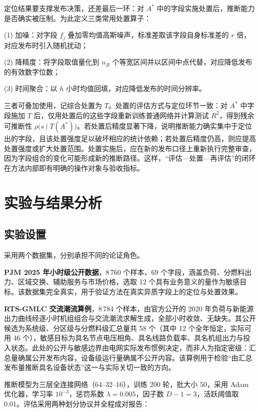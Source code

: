\documentclass[UTF8,zihao=5,twoside]{ctexart}
\begin{document}
定位结果要支撑发布决策，还差最后一环：对 $A^{\ast}$ 中的字段实施处置后，推断能力是否确实被压制。为此定义三类常用处置算子：

(1) 加噪：对字段 $f_j$ 叠加零均值高斯噪声，标准差取该字段自身标准差的 $r$ 倍，对应发布时引入随机扰动；

(2) 降精度：将字段取值量化到 $n_B$ 个等宽区间并以区间中点代替，对应降低发布的有效数字位数；

(3) 时间聚合：以 $h$ 小时均值回填，对应降低发布的时间分辨率。

三者可叠加使用，记综合处置为 $T$。处置的评估方式与定位环节一致：对 $A^{\ast}$ 中字段施加 $T$ 后，仅用处置后的这些字段重新训练普通网络并计算测试 $R^2$，得到残余可推断性 $\rho\big(s\mid T(A^{\ast})\big)$。若处置后精度显著下降，说明推断能力确实集中于定位出的字段，且该处置强度足以破坏相应的统计依赖；若处置后精度仍高，则应提高处置强度或扩大处置范围。处置实施后，应在新的发布口径上重新执行完整审查，因为字段组合的变化可能形成新的推断路径。这样，“评估—处置—再评估”的闭环在方法内部即有明确的操作对象与验收指标。

\section{实验与结果分析}

\subsection{实验设置}

采用两个数据集，分别承担不同的论证角色。

\textbf{PJM 2025 年小时级公开数据}\cite{ref-pjm-dataminer}，8\,760 个样本、69 个字段，涵盖负荷、分燃料出力、区域交换、辅助服务与市场价格，选取 12 个具有业务意义的量作为敏感目标。该数据集完全真实，用于验证方法在真实异质字段上的定位与处置效果。

\textbf{RTS-GMLC 交流潮流算例}\cite{ref-rtsgmlc}，8\,784 个样本，由官方公开的 2020 年负荷与新能源出力曲线经逐小时机组组合与交流潮流求解生成，全部小时收敛、无缺失。其公开候选为系统级、分区级与分燃料级汇总量共 58 个（其中 12 个全年恒定，实际可用 46 个），敏感目标为具名节点电压相角、具名线路负载率、具名机组出力与投入状态。此处的公开与敏感边界由电网实际发布惯例决定，而非人为指定密级：汇总量确属公开发布内容，设备级运行量确属不公开内容。该算例用于检验“由汇总发布量推断具名设备状态”这一与实际关切一致的方向。

推断模型为三层全连接网络（64--32--16），训练 200 轮，批大小 50，采用 Adam 优化器\cite{ref-kingma-adam}，学习率 $10^{-3}$，惩罚系数 $\lambda=0.005$，因子数 $D-1=3$，活跃阈值取 0.01。评估采用两种划分协议并全程成对报告：
\end{document}
